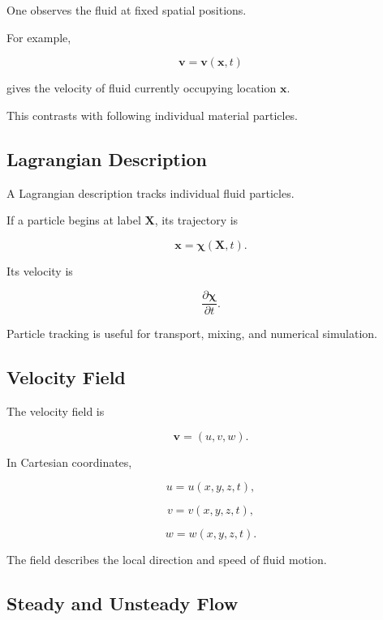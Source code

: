 One observes the fluid at fixed spatial positions.

For example,

\[
\boxed{
\mathbf{v}
=
\mathbf{v}(\mathbf{x},t)
}
\]

gives the velocity of fluid currently occupying location \(\mathbf{x}\).

This contrasts with following individual material particles.

\subsection{Lagrangian Description}
\label{subsec:fluid-lagrangian-description}

A Lagrangian description tracks individual fluid particles.

If a particle begins at label \(\mathbf{X}\), its trajectory is

\[
\boxed{
\mathbf{x}
=
\boldsymbol{\chi}(\mathbf{X},t).
}
\]

Its velocity is

\[
\boxed{
\frac{\partial\boldsymbol{\chi}}
{\partial t}.
}
\]

Particle tracking is useful for transport, mixing, and numerical simulation.

\subsection{Velocity Field}
\label{subsec:fluid-velocity-field}

The velocity field is

\[
\boxed{
\mathbf{v}
=
(u,v,w).
}
\]

In Cartesian coordinates,

\[
u
=
u(x,y,z,t),
\]

\[
v
=
v(x,y,z,t),
\]

\[
w
=
w(x,y,z,t).
\]

The field describes the local direction and speed of fluid motion.

\subsection{Steady and Unsteady Flow}
\label{subsec:steady-unsteady-flow}

